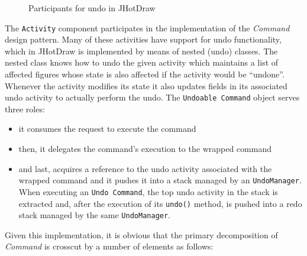 \begin{figure}[H]
	\centering
  	\caption{Participants for undo in JHotDraw \cite{marin2004refactoring}}
  	\label{fig:Participants_for_undo_in_JHotDraw}
\end{figure}

The \texttt{Activity} component participates in the implementation of the \textit{Command} design pattern\cite{gamma1995design}. 
Many of these activities have support for undo functionality, which in JHotDraw is implemented by means of nested (undo) classes. 
The nested class knows how to undo the given activity which maintains a list of affected figures whose state is also affected if the activity would be ``undone''. 
Whenever the activity modifies its state it also updates fields in its associated undo activity to actually perform the undo. 
The \texttt{Undoable Command} object serves three roles: 

\begin{itemize}
	\item it consumes the request to execute the command

	\item then, it delegates the command's execution to the wrapped command 

	\item and last, acquires a reference to the undo activity associated with the wrapped command and it pushes it into a stack managed by an \texttt{UndoManager}. 
	When executing an \texttt{Undo Command}, the top undo activity in the stack is extracted and, after the execution of its \texttt{undo()} method, is pushed into a redo stack managed by the same \texttt{UndoManager}.
\end{itemize}

Given this implementation, it is obvious that the primary decomposition of \textit{Command} is crosscut by a number of elements as follows: 


